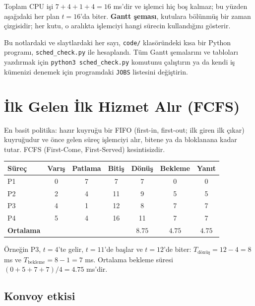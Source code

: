 \documentclass[11pt,a4paper]{article}
\newcommand{\term}[1]{\textbf{\color{mintdeep}#1}}
\newcommand{\cmd}[1]{\texttt{#1}}
\begin{document}
Toplam CPU işi $7+4+1+4=16$ ms'dir ve işlemci hiç boş kalmaz; bu yüzden aşağıdaki her plan $t=16$'da biter. \term{Gantt şeması}, kutulara bölünmüş bir zaman çizgisidir; her kutu, o aralıkta işlemciyi hangi sürecin kullandığını gösterir.

Bu notlardaki ve slaytlardaki her sayı, \texttt{code/} klasöründeki kısa bir Python programı, \texttt{sched\_check.py} ile hesaplandı. Tüm Gantt şemalarını ve tabloları yazdırmak için \cmd{python3 sched\_check.py} komutunu çalıştırın ya da kendi iş kümenizi denemek için programdaki \texttt{JOBS} listesini değiştirin.

\section{İlk Gelen İlk Hizmet Alır (FCFS)}

En basit politika: hazır kuyruğu bir FIFO (first-in, first-out; ilk giren ilk çıkar) kuyruğudur ve önce gelen süreç işlemciyi alır, bitene ya da bloklanana kadar tutar. FCFS (First-Come, First-Served) kesintisizdir.

\begin{center}
\end{center}

\begin{center}
\renewcommand{\arraystretch}{1.2}
\begin{tabular}{@{}lcccccc@{}}
\toprule
\textbf{Süreç} & \textbf{Varış} & \textbf{Patlama} & \textbf{Bitiş} & \textbf{Dönüş} & \textbf{Bekleme} & \textbf{Yanıt}\\
\midrule
P1 & 0 & 7 & 7 & 7 & 0 & 0\\
P2 & 2 & 4 & 11 & 9 & 5 & 5\\
P3 & 4 & 1 & 12 & 8 & 7 & 7\\
P4 & 5 & 4 & 16 & 11 & 7 & 7\\
\midrule
\textbf{Ortalama} & & & & $8.75$ & $4.75$ & $4.75$\\
\bottomrule
\end{tabular}
\end{center}

Örneğin P3, $t=4$'te gelir, $t=11$'de başlar ve $t=12$'de biter: $T_{\text{dönüş}} = 12-4 = 8$ ms ve $T_{\text{bekleme}} = 8-1 = 7$ ms. Ortalama bekleme süresi $(0+5+7+7)/4 = 4.75$ ms'dir.

\subsection{Konvoy etkisi}
\end{document}
